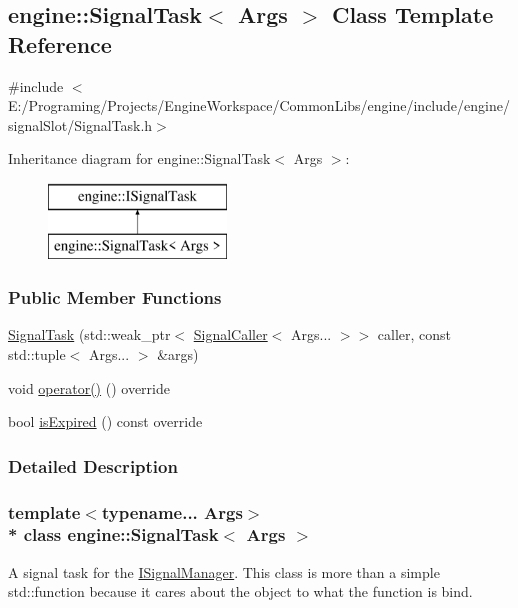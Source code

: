 \hypertarget{a00068}{}\subsection{engine\+:\+:Signal\+Task$<$ Args $>$ Class Template Reference}
\label{a00068}


{\ttfamily \#include $<$E\+:/\+Programing/\+Projects/\+Engine\+Workspace/\+Common\+Libs/engine/include/engine/signal\+Slot/\+Signal\+Task.\+h$>$}

Inheritance diagram for engine\+:\+:Signal\+Task$<$ Args $>$\+:\begin{figure}[H]
\begin{center}
\leavevmode
\includegraphics[height=2.000000cm]{a00068}
\end{center}
\end{figure}
\subsubsection*{Public Member Functions}
\begin{DoxyCompactItemize}
\item 
\hyperlink{a00068_aa084db82b7369830ae2121d03c411045}{Signal\+Task} (std\+::weak\+\_\+ptr$<$ \hyperlink{a00066}{Signal\+Caller}$<$ Args... $>$$>$ caller, const std\+::tuple$<$ Args... $>$ \&args)
\item 
void \hyperlink{a00068_a66e71dfc80f4320c2d5c260028b0bbff}{operator()} () override
\item 
bool \hyperlink{a00068_af923108f7304a686bc4b7eeb41c35177}{is\+Expired} () const  override
\end{DoxyCompactItemize}


\subsubsection{Detailed Description}
\subsubsection*{template$<$typename... Args$>$\\*
class engine\+::\+Signal\+Task$<$ Args $>$}

A signal task for the \hyperlink{a00051}{I\+Signal\+Manager}. This class is more than a simple std\+::function because it cares about the object to what the function is bind. 

